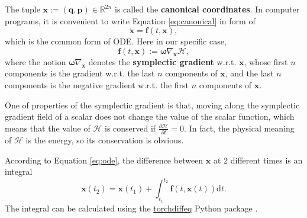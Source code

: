 \documentclass{article}
\begin{document}
The tuple $\mathbf x:=\left(\mathbf q,\mathbf p\right)\in\mathbb R^{2n}$
is called the \textbf{canonical coordinates}.
In computer programs, it is convenient to write Equation \ref{eq:canonical}
in form of
\begin{equation}
	\dot{\mathbf x}=\mathbf f\left(t,\mathbf x\right),
\end{equation}
which is the common form of ODE.
Here in our specific case,
\begin{equation}
	\mathbf f\left(t,\mathbf x\right):=\boldsymbol\omega\nabla_{\mathbf x}\mathcal H,
	\label{eq:ode}
\end{equation}
where the notion $\boldsymbol\omega\nabla_{\mathbf x}$ denotes the \textbf{symplectic gradient} w.r.t. $\mathbf x$,
whose first $n$ components is the gradient w.r.t. the last $n$ components of $\mathbf x$,
and the last $n$ components is the negative gradient w.r.t. the first $n$ components of $\mathbf x$.

One of properties of the symplectic gradient is that,
moving along the symplectic gradient field of a scalar does not change the value of the scalar function,
which means that the value of $\mathcal H$ is conserved if $\frac{\partial\mathcal H}{\partial t}=0$.
In fact, the physical meaning of $\mathcal H$ is the energy,
so its conservation is obvious.

According to Equation \ref{eq:ode}, the difference between $\mathbf x$ at 2 different times is an integral
\begin{equation}
	\mathbf x\left(t_2\right)=\mathbf x\left(t_1\right)+\int_{t_1}^{t_2}\mathbf f\left(t,\mathbf x\left(t\right)\right)\mathrm dt.
	\label{eq:int}
\end{equation}
The integral can be calculated using the \href{https://github.com/rtqichen/torchdiffeq}{torchdiffeq} Python package \cite{chen2018ode}.
\end{document}
